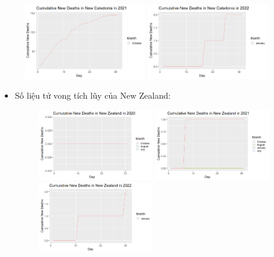 \documentclass[a4paper]{article}
\theoremstyle{definition}
\begin{document}
\begin{enumerate}[i)]
\begin{enumerate}[1]
\begin{itemize}
\begin{figure}[htp!]
    \includegraphics[width=0.47\textwidth]{Images/8.5v.png}
    \includegraphics[width=0.47\textwidth]{Images/8.6v.png}
    \end{figure}
    \end{itemize}
    \begin{itemize}
    \item{Số liệu tử vong tích lũy của New Zealand:}\\ 
     \begin{figure}[htp!]
    \includegraphics[width=0.47\textwidth]{Images/8.7v.png}
    \includegraphics[width=0.47\textwidth]{Images/8.8v.png}
    \includegraphics[width=0.47\textwidth]{Images/8.9v.png}
  \end{figure}
    \end{itemize}
\end{enumerate}


\end{enumerate}
\end{document}
